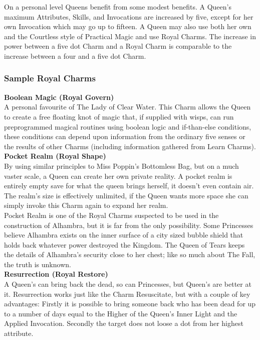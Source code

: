 On a personal level Queens benefit from some modest benefits. A Queen's maximum Attributes, Skills, and Invocations are increased by five, except for her own Invocation which may go up to fifteen. A Queen may also use both her own and the Courtless style of Practical Magic and use Royal Charms. The increase in power between a five dot Charm and a Royal Charm is comparable to the increase between a four and a five dot Charm.

\subsubsection*{Sample Royal Charms}

\textbf{Boolean Magic (Royal Govern)}\\

\noindent A personal favourite of The Lady of Clear Water. This Charm allows the Queen to create a free floating knot of magic that, if supplied with wisps, can run preprogrammed magical routines using boolean logic and if-than-else conditions, these conditions can depend upon information from the ordinary five senses or the results of other Charms (including information gathered from Learn Charms).\\

\noindent \textbf{Pocket Realm (Royal Shape)}\\

\noindent By using similar principles to Miss Poppin's Bottomless Bag, but on a much vaster scale, a Queen can create her own private reality. A pocket realm is entirely empty save for what the queen brings herself, it doesn’t even contain air. The realm's size is effectively unlimited, if the Queen wants more space she can simply invoke this Charm again to expand her realm.\\

Pocket Realm is one of the Royal Charms suspected to be used in the construction of Alhambra, but it is far from the only possibility. Some Princesses believe Alhambra exists on the inner surface of a city sized bubble shield that holds back whatever power destroyed the Kingdom. The Queen of Tears keeps the details of Alhambra's security close to her chest; like so much about The Fall, the truth is unknown.\\

\noindent \textbf{Resurrection (Royal Restore)}\\

\noindent A Queen's can bring back the dead, so can Princesses, but Queen's are better at it. Resurrection works just like the Charm Resuscitate, but with a couple of key advantages: Firstly it is possible to bring someone back who has been dead for up to a number of days equal to the Higher of the Queen's Inner Light and the Applied Invocation. Secondly the target does not loose a dot from her highest attribute. 

